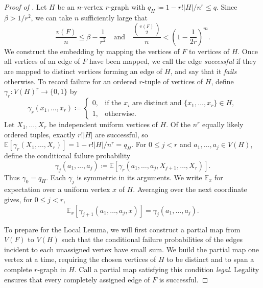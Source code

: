\documentclass[10pt]{article}
\numberwithin{equation}{section}
\newcommand{\E}{\mathbb E}
\begin{document}
\begin{proof}[Proof of ]
Let $H$ be an $n$-vertex $r$-graph with $q_H\coloneqq1-r!|H|/n^r\le q$. Since $\beta>1/r^2$, we can take $n$ sufficiently large that
\begin{equation}\label{eq:n-choice}
\frac{v(F)}n\le\beta-\frac1{r^2}
\quad\text{and}\quad
\frac{\binom{v(F)}2}{n}
<
\left(1-\frac1{2r}\right)^m.
\end{equation}
We construct the embedding by mapping the vertices of $F$ to vertices of $H$. Once all vertices of an edge of $F$ have been mapped, we call the edge \emph{successful} if they are mapped to distinct vertices forming an edge of $H$, and say that it \emph{fails} otherwise. To record failure for an ordered $r$-tuple of vertices of $H$, define $\gamma_r\colon V(H)^r\to\{0,1\}$ by
\[
\gamma_r(x_1,\ldots,x_r)\coloneqq
\begin{cases}
0,&\text{if the $x_i$ are distinct and }\{x_1,\ldots,x_r\}\in H,\\
1,&\text{otherwise}.
\end{cases}
\]
Let $X_1,\ldots,X_r$ be independent uniform vertices of $H$. Of the $n^r$ equally likely ordered tuples, exactly $r!|H|$ are successful, so $\E[\gamma_r(X_1,\ldots,X_r)]=1-r!|H|/n^r=q_H$. For $0\le j<r$ and $a_1,\ldots,a_j\in V(H)$, define the conditional failure probability
\[
\gamma_j(a_1,\ldots,a_j)\coloneqq
\E[\gamma_r(a_1,\ldots,a_j,X_{j+1},\ldots,X_r)].
\]
Thus $\gamma_0=q_H$. Each $\gamma_j$ is symmetric in its arguments. We write $\E_x$ for expectation over a uniform vertex $x$ of $H$. Averaging over the next coordinate gives, for $0\le j<r$,
\begin{equation}\label{eq:tower}
\E_x[\gamma_{j+1}(a_1,\ldots,a_j,x)]
=\gamma_j(a_1,\ldots,a_j).
\end{equation}

To prepare for the Local Lemma, we will first construct a partial map from $V(F)$ to $V(H)$ such that the conditional failure probabilities of the edges incident to each unassigned vertex have small sum. We build the partial map one vertex at a time, requiring the chosen vertices of $H$ to be distinct and to span a complete $r$-graph in $H$. Call a partial map satisfying this condition \emph{legal}. Legality ensures that every completely assigned edge of $F$ is successful.


\end{proof}
\end{document}

